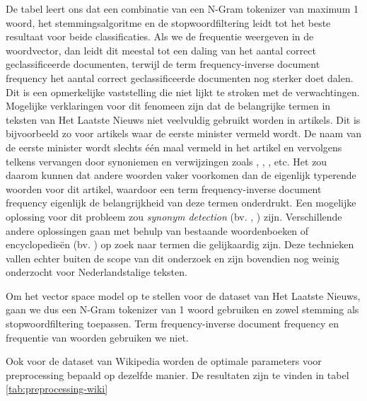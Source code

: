 De tabel leert ons dat een combinatie van een N-Gram tokenizer van maximum 1 woord, het stemmingsalgoritme en de stopwoordfiltering leidt tot het beste resultaat voor beide classificaties. Als we de frequentie weergeven in de woordvector, dan leidt dit meestal tot een daling van het aantal correct geclassificeerde documenten, terwijl de term frequency-inverse document frequency het aantal correct geclassificeerde documenten nog sterker doet dalen. Dit is een opmerkelijke vaststelling die niet lijkt te stroken met de verwachtingen. Mogelijke verklaringen voor dit fenomeen zijn dat de belangrijke termen in teksten van Het Laatste Nieuws niet veelvuldig gebruikt worden in artikels. Dit is bijvoorbeeld zo voor artikels waar de eerste minister vermeld wordt. De naam van de eerste minister wordt slechts \'e\'en maal vermeld in het artikel en vervolgens telkens vervangen door synoniemen en verwijzingen zoals , , , etc. Het zou daarom kunnen dat andere woorden vaker voorkomen dan de eigenlijk typerende woorden voor dit artikel, waardoor een term frequency-inverse document frequency eigenlijk de belangrijkheid van deze termen onderdrukt. Een mogelijke oplossing voor dit probleem zou \textit{synonym detection} (bv. \cite{Zesch2008}, \cite{Weale2009}) zijn. Verschillende andere oplossingen gaan met behulp van bestaande woordenboeken of encyclopedie\"en (bv. \cite{Cheng2013}) op zoek naar termen die gelijkaardig zijn. Deze technieken vallen echter buiten de scope van dit onderzoek en zijn bovendien nog weinig onderzocht voor Nederlandstalige teksten. 

Om het vector space model op te stellen voor de dataset van Het Laatste Nieuws, gaan we dus een N-Gram tokenizer van 1 woord gebruiken en zowel stemming als stopwoordfiltering toepassen. Term frequency-inverse document frequency en frequentie van woorden gebruiken we niet.

Ook voor de dataset van Wikipedia worden de optimale parameters voor preprocessing bepaald op dezelfde manier. De resultaten zijn te vinden in tabel \ref{tab:preprocessing-wiki}

